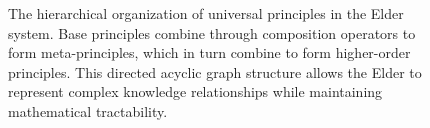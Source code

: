\begin{figure}[h]
\caption{The hierarchical organization of universal principles in the Elder system. Base principles combine through composition operators to form meta-principles, which in turn combine to form higher-order principles. This directed acyclic graph structure allows the Elder to represent complex knowledge relationships while maintaining mathematical tractability.}
\label{fig:hierarchical_principles}
\end{figure}